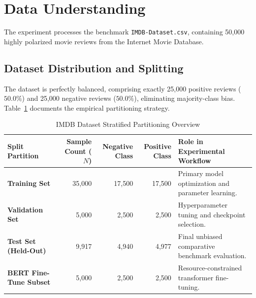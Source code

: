 \documentclass[12pt,a4paper]{report}
\begin{document}
\section{Data Understanding}
The experiment processes the benchmark \texttt{IMDB-Dataset.csv}, containing 50,000 highly polarized movie reviews from the Internet Movie Database.

\subsection{Dataset Distribution and Splitting}
The dataset is perfectly balanced, comprising exactly 25,000 positive reviews ($50.0\%$) and 25,000 negative reviews ($50.0\%$), eliminating majority-class bias. Table~\ref{tab:exp7_data_splits} documents the empirical partitioning strategy.
\begin{table}[H]
\centering
\small
\caption{IMDB Dataset Stratified Partitioning Overview}
\label{tab:exp7_data_splits}
\begin{tabular}{lrrrp{6cm}}
\toprule
\textbf{Split Partition} & \textbf{Sample Count ($N$)} & \textbf{Negative Class} & \textbf{Positive Class} & \textbf{Role in Experimental Workflow} \\
\midrule
\textbf{Training Set} & 35,000 & 17,500 & 17,500 & Primary model optimization and parameter learning. \\
\textbf{Validation Set} & 5,000 & 2,500 & 2,500 & Hyperparameter tuning and checkpoint selection. \\
\textbf{Test Set (Held-Out)} & 9,917 & 4,940 & 4,977 & Final unbiased comparative benchmark evaluation. \\
\midrule
\textbf{BERT Fine-Tune Subset} & 5,000 & 2,500 & 2,500 & Resource-constrained transformer fine-tuning. \\
\bottomrule
\end{tabular}
\end{table}
\end{document}
